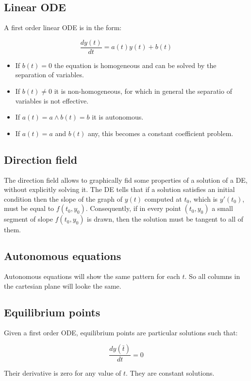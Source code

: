   \subsection{Linear ODE}
  A first order linear ODE is in the form:

  $$\frac{dy(t)}{dt} = a(t)y(t) + b(t)$$

  \begin{multicols}{2}
    \begin{itemize}
      \item If $b(t) = 0$ the equation is homogeneous and can be solved by the separation of variables.
      \item If $b(t) \neq 0$ it is non-homogeneous, for which in general the separatio of variables is not effective.
      \item If $a(t) = a\land b(t) = b$ it is autonomous.
      \item If $a(t) = a$ and $b(t)$ any, this becomes a constant coefficient problem.
    \end{itemize}
  \end{multicols}

  \subsection{Direction field}
The direction field allows to graphically fid some properties of a solution of a DE, without explicitly solving it.
The DE tells that if a solution satisfies an initial condition then the slope of the graph of $y(t)$ computed at $t_0$, which is $y'(t_0)$, must be equal to $f(t_0, y_0)$.
Consequently, if in every point $(t_0, y_0)$ a small segment of slope $f(t_0, y_0)$ is drawn, then the solution must be tangent to all of them.

	\subsection{Autonomous equations}
	Autonomous equations will show the same pattern for each $t$.
	So all columns in the cartesian plane will looke the same.

  \subsection{Equilibrium points}
  Given a first order ODE, equilibrium points are particular solutions such that:

  $$\frac{dy(\bar{t})}{dt} = 0$$

  Their derivative is zero for any value of $t$.
  They are constant solutions.

